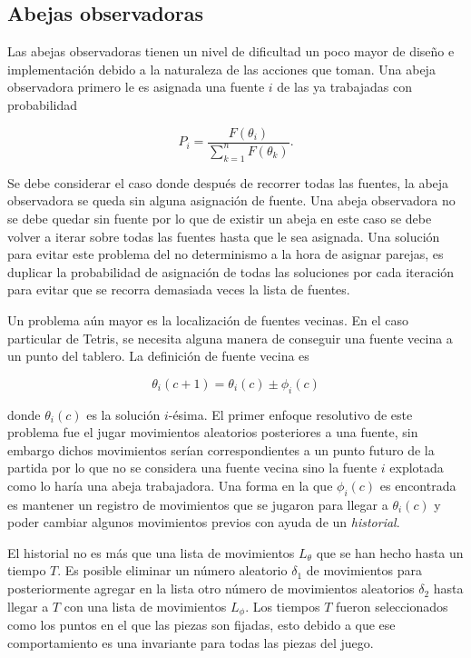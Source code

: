 \subsection{Abejas observadoras}

Las abejas observadoras tienen un nivel de dificultad un poco mayor de diseño e 
implementación debido a la naturaleza de las acciones que toman. Una abeja 
observadora primero le es asignada una fuente $i$ de las ya trabajadas con 
probabilidad 

\begin{displaymath}
  P_{i} = \frac{F(\theta_{i})}{\sum_{k=1}^{n} F(\theta_{k})}.
\end{displaymath}

Se debe considerar el caso donde después de recorrer todas las fuentes, la 
abeja observadora se queda sin alguna asignación de fuente. 
Una abeja observadora no se debe quedar 
sin fuente por lo que de existir un abeja en este caso se debe volver a iterar 
sobre todas las fuentes hasta que le sea asignada. Una solución para evitar este 
problema del no determinismo a la hora de asignar parejas, es duplicar la 
probabilidad de asignación de todas las soluciones por cada iteración para 
evitar que se recorra demasiada veces la lista de fuentes. 

Un problema aún mayor es la localización de fuentes vecinas. En el caso particular 
de Tetris, se necesita alguna manera de conseguir una fuente vecina a un punto 
del tablero. La definición de fuente vecina es 

\begin{displaymath}
  \theta_{i}(c+1) = \theta_{i}(c) \pm \phi_{i}(c)
\end{displaymath}

\noindent
donde $\theta_{i}(c)$ es la solución $i$-ésima. El primer enfoque resolutivo de este 
problema fue el jugar movimientos aleatorios posteriores a una fuente, 
sin embargo dichos movimientos serían correspondientes a un punto futuro de la partida 
por lo que no se considera una fuente vecina sino la fuente $i$ explotada como 
lo haría una abeja trabajadora. 
Una forma en la que $\phi_{i}(c)$ es encontrada es mantener un registro de 
movimientos que se jugaron para llegar a $\theta_{i}(c)$ y poder cambiar algunos 
movimientos previos con ayuda de un \textit{historial}.

El historial no es más que una lista de movimientos $L_{\theta}$ que se han hecho hasta un 
tiempo $T$. Es posible eliminar un número aleatorio $\delta_{1}$ de movimientos 
para posteriormente agregar en la lista otro número de movimientos aleatorios $\delta_{2}$ hasta 
llegar a $T$ con una lista de movimientos $L_{\phi}$. Los tiempos $T$ fueron seleccionados 
como los puntos en 
el que las piezas son fijadas, esto debido a que ese comportamiento es una invariante 
para todas las piezas del juego.

